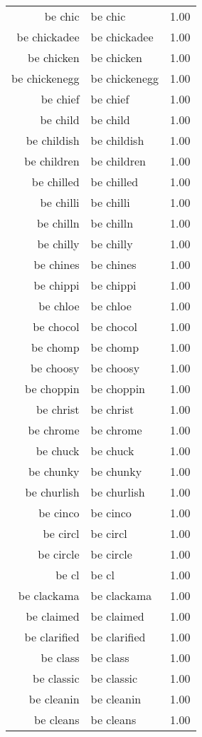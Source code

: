 \begin{table}[ht]
\begin{tabular}{rlr}
  be chic & be chic & 1.00 \\ 
  be chickadee & be chickadee & 1.00 \\ 
  be chicken & be chicken & 1.00 \\ 
  be chickenegg & be chickenegg & 1.00 \\ 
  be chief & be chief & 1.00 \\ 
  be child & be child & 1.00 \\ 
  be childish & be childish & 1.00 \\ 
  be children & be children & 1.00 \\ 
  be chilled & be chilled & 1.00 \\ 
  be chilli & be chilli & 1.00 \\ 
  be chilln & be chilln & 1.00 \\ 
  be chilly & be chilly & 1.00 \\ 
  be chines & be chines & 1.00 \\ 
  be chippi & be chippi & 1.00 \\ 
  be chloe & be chloe & 1.00 \\ 
  be chocol & be chocol & 1.00 \\ 
  be chomp & be chomp & 1.00 \\ 
  be choosy & be choosy & 1.00 \\ 
  be choppin & be choppin & 1.00 \\ 
  be christ & be christ & 1.00 \\ 
  be chrome & be chrome & 1.00 \\ 
  be chuck & be chuck & 1.00 \\ 
  be chunky & be chunky & 1.00 \\ 
  be churlish & be churlish & 1.00 \\ 
  be cinco & be cinco & 1.00 \\ 
  be circl & be circl & 1.00 \\ 
  be circle & be circle & 1.00 \\ 
  be cl & be cl & 1.00 \\ 
  be clackama & be clackama & 1.00 \\ 
  be claimed & be claimed & 1.00 \\ 
  be clarified & be clarified & 1.00 \\ 
  be class & be class & 1.00 \\ 
  be classic & be classic & 1.00 \\ 
  be cleanin & be cleanin & 1.00 \\ 
  be cleans & be cleans & 1.00 \\ 

\end{tabular}
\end{table}
